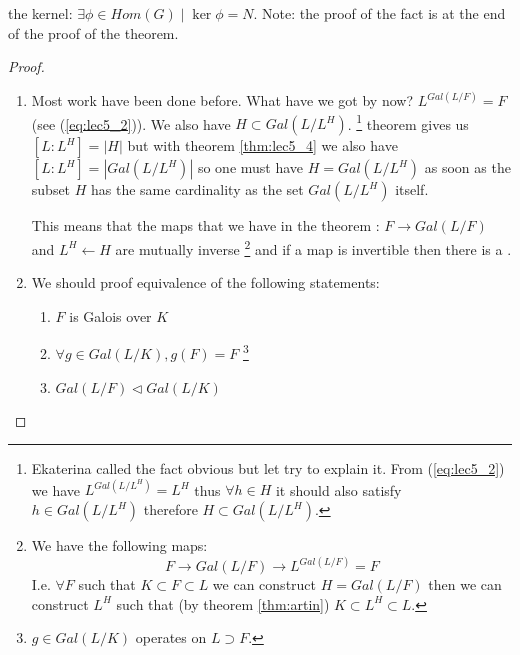 \begin{theorem}
\begin{enumerate}
{      the kernel: $\exists \phi \in Hom(G) \mid \ker{\phi} =N$. Note:
      the proof of the fact is at the end of the proof of the theorem. 
    }
  \end{enumerate}
  \begin{proof}
    \begin{enumerate}
    \item Most work have been done before. What have we got by now?
      $L^{Gal\left(L/F\right)} = F$ (see (\ref{eq:lec5_2})). We also
      have $H \subset Gal\left(L/L^H\right)$.
      \footnote{
        Ekaterina called the fact obvious but let try to explain it.
        From (\ref{eq:lec5_2}) we have
        $L^{Gal\left(L/L^H\right)} = L^H$ thus
        $\forall h \in H$ it should also satisfy $h \in
        Gal\left(L/L^H\right)$ therefore $H \subset
        Gal\left(L/L^H\right)$. 
      }
       theorem gives us
      $\left[L:L^H\right] = \left|H\right|$ but with theorem
      \ref{thm:lec5_4} we also have
      $\left[L:L^H\right] = \left|Gal\left(L/L^H\right)\right|$ so one
      must have $H = Gal\left(L/L^H\right)$ as soon as the subset $H$
      has the same cardinality as the set $Gal\left(L/L^H\right)$ itself.

      This means that the maps that we have in the theorem :
      $F \rightarrow Gal\left(L/F\right)$ and
      $L^H \leftarrow H$ are mutually inverse
      \footnote{
        We have the following maps:
        \[
        F \to Gal\left(L/F\right) \to L^{Gal\left(L/F\right)} = F
        \]
        I.e. $\forall F$ such that $K \subset F \subset L$ we can
        construct $H = Gal\left(L/F\right)$ then we can construct
        $L^H$ such that (by theorem \ref{thm:artin})
        $K \subset L^H \subset L$.
      }
      and if a map is invertible then there is a .
    \item We should proof equivalence of the following statements:
      \begin{enumerate}
      \item $F$ is Galois over $K$ \label{item:galoiscorrespondence1}
      \item $\forall g \in Gal\left(L/K\right), g\left(F\right) = F$
        \label{item:galoiscorrespondence2}
        \footnote{
          $g \in Gal\left(L/K\right)$ operates on $L \supset F$.
        }
      \item $Gal\left(L/F\right) \triangleleft Gal\left(L/K\right)$
        \label{item:galoiscorrespondence3}
      \end{enumerate}      
    \end{enumerate}


\end{proof}
\end{theorem}
